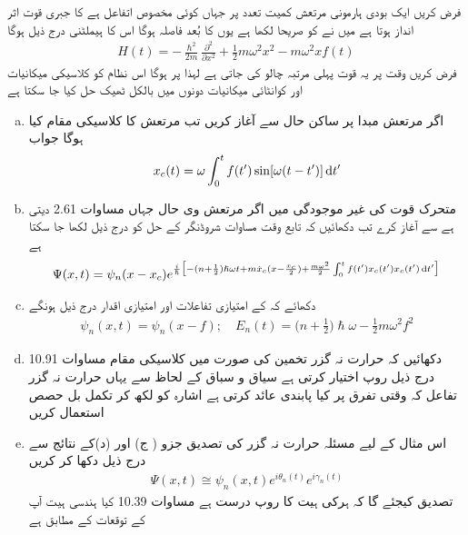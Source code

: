 فرض کریں ایک بودی ہارمونی مرتعش کمیت  تعدد  پر  جہاں  کوئی مخصوص اتفاعل ہے کا جبری قوت اثر انداز ہوتا ہے میں نے  کو صريحا لکھا ہے یوں  کا بُعد فاصلہ ہوگا اس کا ہیملٹنی درج ذیل ہوگا 
\begin{align}
H(t) = - \frac{\hslash^2}{2m} \frac{\partial^2}{\partial x^2} + \frac{1}{2} m \omega^2 x^2 - m \omega^2 x f (t)
\end{align}
فرض کریں وقت  پر یہ قوت پہلی مرتبہ چالو کی جاتی ہے لہذا  پر  ہوگا اس نظام کو کلاسیکی میکانیات اور کوانٹائی میکانیات دونوں میں بالکل ٹھیک حل کیا جا سکتا ہے 
\begin{enumerate}[a.]
\item
اگر مرتعش مبدا پر ساکن حال  سے آغاز کریں تب مرتعش کا کلاسیکی مقام کیا ہوگا جواب 
\begin{align}
x_c (t) = \omega \int_0^{t} f(t') \sin [\omega (t - t')] \dif t'
\end{align}
\item
متحرک قوت کی غیر موجودگی میں اگر مرتعش  وی حال  جہاں  مساوات 2.61 دیتی ہے سے آغاز کرے تب دکھائیں کہ تابع وقت مساوات شروڈنگر کے حل کو درج ذیل لکھا جا سکتا ہے 
\begin{align}
\Psi (x, t) = \psi_n (x - x_c) e^{\frac{i}{\hslash} \big[- (n + \frac{1}{2}) \hslash \omega t + m \dot{x}_c (x - \frac{x_c}{2}) + \frac{m \omega^2}{2} \int_0^t f (t') x_c (t') x_c (t') \dif t'\big]}
\end{align}
\item
دکھائے کہ  کے امتیازی تفاعلات اور امتیازی اقدار درج ذیل ہونگے 
\begin{align}
\psi_n (x, t) = \psi_n (x - f); \quad E_n (t) = \big ( n + \frac{1}{2} \big ) \hslash \omega - \frac{1}{2} m \omega^2 f^2
\end{align}
\item
دکھائیں کہ حرارت نہ گزر تخمین کی صورت میں کلاسیکی مقام مساوات 10.91 درج ذیل روپ اختیار کرتی ہے  سیاق و سباق کے لحاظ سے یہاں حرارت نہ گزر تفاعل  کہ وقتی تفرق پر کیا پابندی عائد کرتی ہے اشارہ  کو  لکھ کر تکمل بل حصص استعمال کریں 
\item
اس مثال کے لیے مسئلہ حرارت نہ گزر کی تصدیق جزو ( ج) اور (د)کے نتائج سے درج ذیل دکھا کر کریں 
\begin{align}
\Psi (x, t) \cong \psi_n (x, t) e^{i \theta_n (t)} e^{i \gamma_n (t)}
\end{align}
تصدیق کیجئے گا کہ ہرکی ہیت کا روپ درست ہے مساوات 10.39 کیا ہندسی ہیت آپ کے توقعات کے مطابق ہے  
\end{enumerate}

